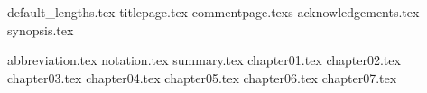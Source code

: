 \documentclass{report}
\begin{document}
	{default_lengths.tex}
	{titlepage.tex}
	{commentpage.tex}s
	{acknowledgements.tex}
	{synopsis.tex}
	\setcounter{tocdepth}{1}
	\renewcommand{\baselinestretch}{0.5}\normalsize
	\tableofcontents %
	\renewcommand{\baselinestretch}{1.0}\normalsize
	\newpage{}
	\listoffigures %
	\listoftables %
	\newpage
	{abbreviation.tex}
	{notation.tex}
	{summary.tex}
	{chapter01.tex}
	{chapter02.tex}
	{chapter03.tex}
	{chapter04.tex}
	{chapter05.tex}
	{chapter06.tex}
	{chapter07.tex}
	
	\printbibliography
	
	
\end{document}
